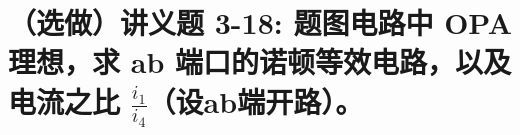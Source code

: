 \documentclass[UTF8]{report}
\theoremstyle{MyLineTheoremStyle} %
\theoremstyle{MyBlockTheoremStyle} %
\theoremstyle{MySubsubsectionStyle} %
\begin{document}
\section{（选做）讲义题 3-18: 题图电路中 OPA 理想，求 ab 端口的诺顿等效电路，以及电流之比 $\frac{i_1}{i_4}$（设ab端开路）。}










































































\newpage
\appendix
\titleformat{\chapter}[hang]{\normalfont\huge\bfseries\centering}{}{20pt}{}
\titlespacing*{\chapter}{0pt}{-25pt}{8pt} %
\titleformat{\section}[hang]{\normalfont\centering\Large\bfseries  }{\thesection}{8pt}{}
\end{document}

